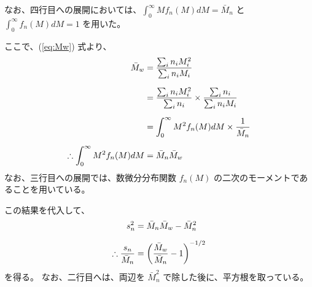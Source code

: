 \documentclass[uplatex,dvipdfmx,a4paper,11pt, titlepage]{jsarticle}
\begin{document}
\begin{appendix}
なお、四行目への展開においては、$\displaystyle \int_0^{\infty} M f_n(M) dM = \bar{M}_n$ と $\displaystyle \int_0^{\infty} f_n(M) dM = 1$ を用いた。

ここで、(\ref{eq:Mw}) 式より、
\begin{align}
{\bar M}_w 
	&= \dfrac{\sum_i n_i M_i^2}{\sum_i n_i M_i}\notag \\[6pt]
	&= \dfrac{\sum_i n_i M_i^2}{\sum_i n_i} \times \dfrac{\sum_i n_i}{\sum_i n_i M_i}\notag \\[6pt]
	&= \displaystyle \int_0^{\infty} M^2 f_n(M) dM \times \dfrac{1}{\bar{M}_n }\notag \\[6pt]
\therefore \displaystyle \int_0^{\infty} M^2 f_n(M) dM &= \bar{M}_n \bar{M}_w
\end{align}
なお、三行目への展開では、数微分分布関数 $f_n(M)$ の二次のモーメントであることを用いている。

この結果を代入して、
\begin{align}
s_n^2 &= \bar{M}_n \bar{M}_w - \bar{M}_n^2\notag \\[6pt]
\therefore \dfrac{s_n}{\bar{M}_n} &= \left(\dfrac{\bar{M}_w}{ \bar{M}_n} - 1 \right)^{-1/2}
\end{align}
を得る。
なお、二行目へは、両辺を $\bar{M}_n^2$ で除した後に、平方根を取っている。

\end{appendix}


%

%
%
\end{document}
